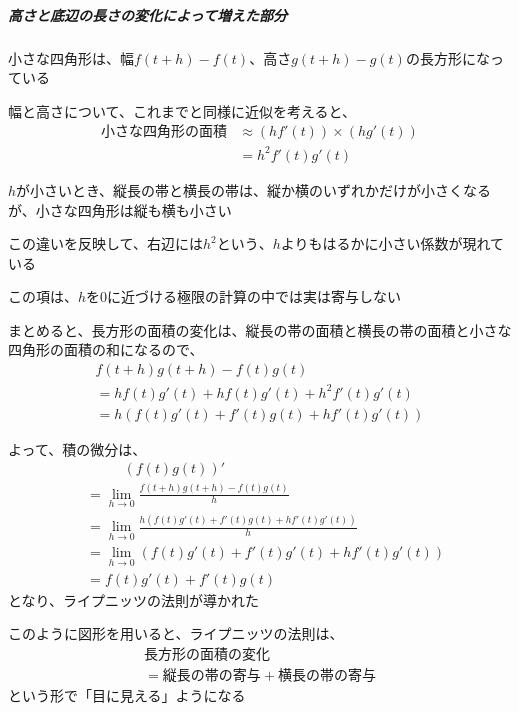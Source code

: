 \documentclass[../book_jiriki_calc]{subfiles}
\begin{document}
\sectionline

\subparagraph{高さと底辺の長さの変化によって増えた部分}\quad

小さな四角形は、幅$f(t+h)-f(t)$、高さ$g(t+h)-g(t)$の長方形になっている

幅と高さについて、これまでと同様に近似を考えると、
\begin{align}
  \text{小さな四角形の面積} & \approx (hf'(t))\times (hg'(t)) \\
                   & = h^2f'(t)g'(t)
\end{align}

$h$が小さいとき、縦長の帯と横長の帯は、縦か横のいずれかだけが小さくなるが、小さな四角形は縦も横も小さい

この違いを反映して、右辺には$h^2$という、$h$よりもはるかに小さい係数が現れている

この項は、$h$を$0$に近づける極限の計算の中では実は寄与しない

\sectionline

まとめると、長方形の面積の変化は、縦長の帯の面積と横長の帯の面積と小さな四角形の面積の和になるので、
\begin{multline}
  f(t+h)g(t+h) - f(t)g(t) \\ = hf(t)g'(t) + hf(t)g'(t) + h^2f'(t)g'(t)
  \\ = h\left( f(t)g'(t) + f'(t)g(t) + hf'(t)g'(t)\right)
\end{multline}

よって、積の微分は、
\begin{align}
   & \phantom{==} (f(t)g(t))'                                                      \\
   & = \lim_{h \to 0} \frac{f(t+h)g(t+h) - f(t)g(t)}{h}                            \\
   & = \lim_{h \to 0} \frac{h\left( f(t)g'(t) + f'(t)g(t) + hf'(t)g'(t)\right)}{h} \\
   & = \lim_{h \to 0} \left( f(t)g'(t) + f'(t)g'(t)+ hf'(t)g'(t)\right)            \\
   & = f(t)g'(t) + f'(t)g(t)
\end{align}
となり、ライプニッツの法則が導かれた

\sectionline

このように図形を用いると、ライプニッツの法則は、
\begin{multline}
  \text{長方形の面積の変化} \\ = \text{縦長の帯の寄与} + \text{横長の帯の寄与}
\end{multline}
という形で「目に見える」ようになる
\end{document}
